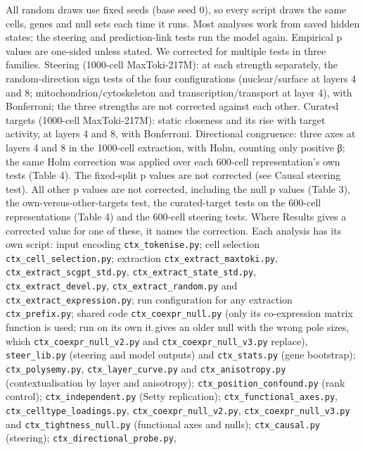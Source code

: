 \documentclass[
  11pt,
]{article}
\begin{document}
All random draws use fixed seeds (base seed 0), so every script draws
the same cells, genes and null sets each time it runs. Most analyses
work from saved hidden states; the steering and prediction-link tests
run the model again. Empirical p values are one-sided unless stated. We
corrected for multiple tests in three families. Steering (1000-cell
MaxToki-217M): at each strength separately, the random-direction sign
tests of the four configurations (nuclear/surface at layers 4 and 8;
mitochondrion/cytoskeleton and transcription/transport at layer 4), with
Bonferroni; the three strengths are not corrected against each other.
Curated targets (1000-cell MaxToki-217M): static closeness and its rise
with target activity, at layers 4 and 8, with Bonferroni. Directional
congruence: three axes at layers 4 and 8 in the 1000-cell extraction,
with Holm, counting only positive β; the same Holm correction was
applied over each 600-cell representation's own tests (Table 4). The
fixed-split p values are not corrected (see Causal steering test). All
other p values are not corrected, including the null p values (Table 3),
the own-versus-other-targets test, the curated-target tests on the
600-cell representations (Table 4) and the 600-cell steering tests.
Where Results gives a corrected value for one of these, it names the
correction. Each analysis has its own script: input encoding
\texttt{ctx\_tokenise.py}; cell selection
\texttt{ctx\_cell\_selection.py}; extraction
\texttt{ctx\_extract\_maxtoki.py}, \texttt{ctx\_extract\_scgpt\_std.py},
\texttt{ctx\_extract\_state\_std.py}, \texttt{ctx\_extract\_devel.py},
\texttt{ctx\_extract\_random.py} and
\texttt{ctx\_extract\_expression.py}; run configuration for any
extraction \texttt{ctx\_prefix.py}; shared code
\texttt{ctx\_coexpr\_null.py} (only its co-expression matrix function is
used; run on its own it gives an older null with the wrong pole sizes,
which \texttt{ctx\_coexpr\_null\_v2.py} and
\texttt{ctx\_coexpr\_null\_v3.py} replace), \texttt{steer\_lib.py}
(steering and model outputs) and \texttt{ctx\_stats.py} (gene
bootstrap); \texttt{ctx\_polysemy.py}, \texttt{ctx\_layer\_curve.py} and
\texttt{ctx\_anisotropy.py} (contextualisation by layer and anisotropy);
\texttt{ctx\_position\_confound.py} (rank control);
\texttt{ctx\_independent.py} (Setty replication);
\texttt{ctx\_functional\_axes.py}, \texttt{ctx\_celltype\_loadings.py},
\texttt{ctx\_coexpr\_null\_v2.py}, \texttt{ctx\_coexpr\_null\_v3.py} and
\texttt{ctx\_tightness\_null.py} (functional axes and nulls);
\texttt{ctx\_causal.py} (steering); \texttt{ctx\_directional\_probe.py},
\end{document}
